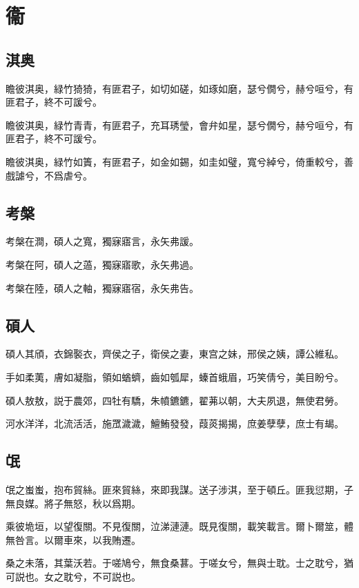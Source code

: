 \section[衞]{衞}

\subsection[淇奥]{淇奥}

瞻彼淇奥，緑竹猗猗，有匪君子，如切如磋，如琢如磨，瑟兮僩兮，赫兮咺兮，有匪君子，終不可諼兮。

瞻彼淇奥，緑竹青青，有匪君子，充耳琇瑩，會弁如星，瑟兮僩兮，赫兮咺兮，有匪君子，終不可諼兮。

瞻彼淇奥，緑竹如簀，有匪君子，如金如錫，如圭如璧，寬兮綽兮，倚重較兮，善戲謔兮，不爲虐兮。

\subsection[考槃]{考槃}

考槃在澗，碩人之寬，獨寐寤言，永矢弗諼。

考槃在阿，碩人之薖，獨寐寤歌，永矢弗過。

考槃在陸，碩人之軸，獨寐寤宿，永矢弗告。

\subsection[碩人]{碩人}

碩人其頎，衣錦褧衣，齊侯之子，衛侯之妻，東宫之妹，邢侯之姨，譚公維私。

手如柔荑，膚如凝脂，領如蝤蠐，齒如瓠犀，螓首蛾眉，巧笑倩兮，美目盼兮。

碩人敖敖，説于農郊，四牡有驕，朱幩鑣鑣，翟茀以朝，大夫夙退，無使君勞。

河水洋洋，北流活活，施罛濊濊，鱣鮪發發，葭菼揭揭，庶姜孽孽，庶士有朅。

\subsection[氓]{氓}

氓之蚩蚩，抱布貿絲。匪來貿絲，來即我謀。送子涉淇，至于頓丘。匪我愆期，子無良媒。將子無怒，秋以爲期。

乘彼垝垣，以望復關。不見復關，泣涕漣漣。既見復關，載笑載言。爾卜爾筮，體無咎言。以爾車來，以我賄遷。

桑之未落，其葉沃若。于嗟鳩兮，無食桑葚。于嗟女兮，無與士耽。士之耽兮，猶可説也。女之耽兮，不可説也。

